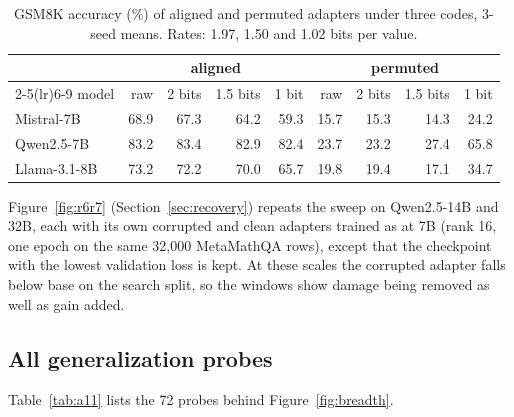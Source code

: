 \begin{table}[h]
\caption{GSM8K accuracy (\%) of aligned and permuted adapters under three codes, 3-seed means. Rates: 1.97, 1.50 and 1.02 bits per value.}
\label{tab:a6}
\centering
\small
\begin{tabular}{lrrrrrrrr}
\toprule
 & \multicolumn{4}{c}{aligned} & \multicolumn{4}{c}{permuted} \\
\cmidrule(lr){2-5}\cmidrule(lr){6-9}
model & raw & 2 bits & 1.5 bits & 1 bit & raw & 2 bits & 1.5 bits & 1 bit \\
\midrule
Mistral-7B & 68.9 & 67.3 & 64.2 & 59.3 & 15.7 & 15.3 & 14.3 & 24.2 \\
Qwen2.5-7B & 83.2 & 83.4 & 82.9 & 82.4 & 23.7 & 23.2 & 27.4 & 65.8 \\
Llama-3.1-8B & 73.2 & 72.2 & 70.0 & 65.7 & 19.8 & 19.4 & 17.1 & 34.7 \\
\bottomrule
\end{tabular}
\end{table}

Figure~\ref{fig:r6r7} (Section~\ref{sec:recovery}) repeats the sweep on Qwen2.5-14B and 32B, each with its own corrupted and clean adapters trained as at 7B (rank 16, one epoch on the same 32,000 MetaMathQA rows), except that the checkpoint with the lowest validation loss is kept. At these scales the corrupted adapter falls below base on the search split, so the windows show damage being removed as well as gain added.

\subsection{All generalization probes}
\label{app:breadth}

Table~\ref{tab:a11} lists the 72 probes behind Figure~\ref{fig:breadth}.

{\small\setlength{\tabcolsep}{4pt}

}
